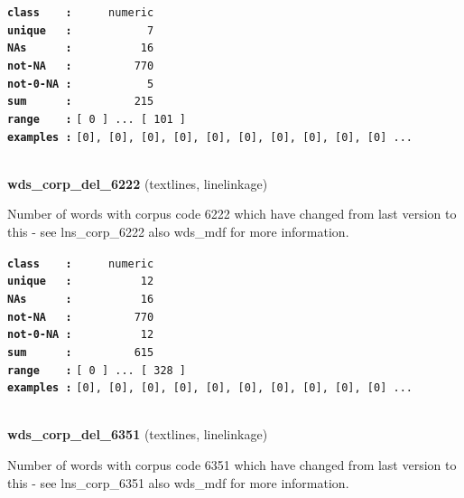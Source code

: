\documentclass[]{article}
\begin{document}
\textbf{\texttt{class\ \ \ \ :}} \texttt{~~~~~numeric}\\
\textbf{\texttt{unique\ \ \ :}} \texttt{~~~~~~~~~~~7}\\
\textbf{\texttt{NAs\ \ \ \ \ \ :}} \texttt{~~~~~~~~~~16}\\
\textbf{\texttt{not-NA\ \ \ :}} \texttt{~~~~~~~~~770}\\
\textbf{\texttt{not-0-NA\ :}} \texttt{~~~~~~~~~~~5}\\
\textbf{\texttt{sum\ \ \ \ \ \ :}} \texttt{~~~~~~~~~215}\\
\textbf{\texttt{range\ \ \ \ :}}
\texttt{{[}\ 0\ {]}\ ...\ {[}\ 101\ {]}}\\
\textbf{\texttt{examples\ :}}
\texttt{{[}0{]},\ {[}0{]},\ {[}0{]},\ {[}0{]},\ {[}0{]},\ {[}0{]},\ {[}0{]},\ {[}0{]},\ {[}0{]},\ {[}0{]}\ ...}\\

~

\textbf{wds\_corp\_del\_6222} (textlines, linelinkage)

Number of words with corpus code 6222 which have changed from last
version to this - see lns\_corp\_6222 also wds\_mdf for more
information.

\textbf{\texttt{class\ \ \ \ :}} \texttt{~~~~~numeric}\\
\textbf{\texttt{unique\ \ \ :}} \texttt{~~~~~~~~~~12}\\
\textbf{\texttt{NAs\ \ \ \ \ \ :}} \texttt{~~~~~~~~~~16}\\
\textbf{\texttt{not-NA\ \ \ :}} \texttt{~~~~~~~~~770}\\
\textbf{\texttt{not-0-NA\ :}} \texttt{~~~~~~~~~~12}\\
\textbf{\texttt{sum\ \ \ \ \ \ :}} \texttt{~~~~~~~~~615}\\
\textbf{\texttt{range\ \ \ \ :}}
\texttt{{[}\ 0\ {]}\ ...\ {[}\ 328\ {]}}\\
\textbf{\texttt{examples\ :}}
\texttt{{[}0{]},\ {[}0{]},\ {[}0{]},\ {[}0{]},\ {[}0{]},\ {[}0{]},\ {[}0{]},\ {[}0{]},\ {[}0{]},\ {[}0{]}\ ...}\\

~

\textbf{wds\_corp\_del\_6351} (textlines, linelinkage)

Number of words with corpus code 6351 which have changed from last
version to this - see lns\_corp\_6351 also wds\_mdf for more
information.
\end{document}
